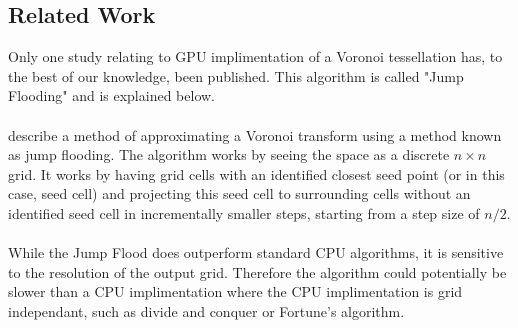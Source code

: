 \subsection{Related Work}\label{gpu:sec:rel}
Only one study relating to GPU implimentation of a Voronoi tessellation has, to the best of our knowledge, been published. This algorithm is called "Jump Flooding" and is explained below.
\\
\\
\citet{rong2006jump} describe a method of approximating a Voronoi transform using a method known as jump flooding. The algorithm works by seeing the space as a discrete $n \times n$ grid. It works by having grid cells with an identified closest seed point (or in this case, seed cell) and projecting this seed cell to surrounding cells without an identified seed cell in incrementally smaller steps, starting from a step size of $n/2$.
\\
\\
While the Jump Flood does outperform standard CPU algorithms, it is sensitive to the resolution of the output grid. Therefore the algorithm could potentially be slower than a CPU implimentation where the CPU implimentation is grid independant, such as divide and conquer or Fortune's algorithm.
